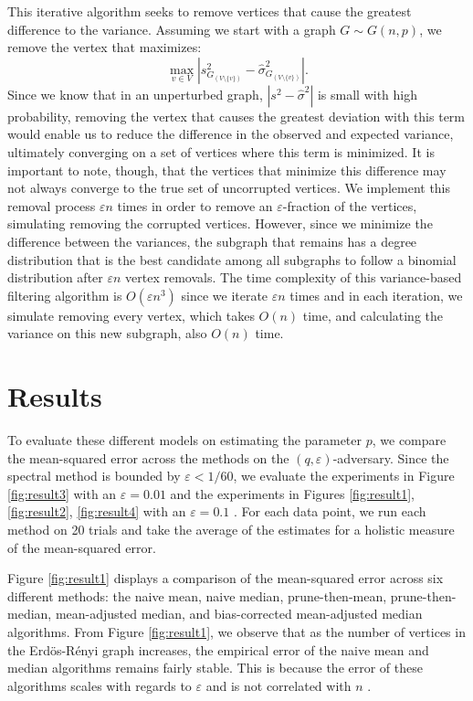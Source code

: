 \documentclass[10pt,onecolumn,letterpaper]{article}
\newcommand{\eps}{\varepsilon}
\newcommand{\erdos}{Erdös-Rényi }
\begin{document}
This iterative algorithm seeks to remove vertices that cause the greatest difference to the variance. Assuming we start with a graph \(G \sim G(n, p)\), we remove the vertex that maximizes: $$\max_{v \in V} \left| s^2_{G_{(V \setminus \{v\})}} - \hat{\sigma}^2_{G_{(V \setminus \{v\})}} \right|.$$ Since we know that in an unperturbed graph, $|s^2 - \hat{\sigma}^2|$ is small with high probability, removing the vertex that causes the greatest deviation with this term would enable us to reduce the difference in the observed and expected variance, ultimately converging on a set of vertices where this term is minimized. It is important to note, though, that the vertices that minimize this difference may not always converge to the true set of uncorrupted vertices. We implement this removal process $\eps$$n$ times in order to remove an $\eps$-fraction of the vertices, simulating removing the corrupted vertices. However, since we minimize the difference between the variances, the subgraph that remains has a degree distribution that is the best candidate among all subgraphs to follow a binomial distribution after $\eps$$n$ vertex removals. The time complexity of this variance-based filtering algorithm is $O(\eps n^3)$ since we iterate $\eps$$n$ times and in each iteration, we simulate removing every vertex, which takes $O(n)$ time, and calculating the variance on this new subgraph, also $O(n)$ time. 

\section{Results} \label{results}
To evaluate these different models on estimating the parameter $p$, we compare the mean-squared error across the methods on the $\left(q, \eps \right)$-adversary. Since the spectral method is bounded by $\eps < 1 / 60$, we evaluate the experiments in Figure \ref{fig:result3} with an $\eps = 0.01$ and the experiments in Figures \ref{fig:result1}, \ref{fig:result2}, \ref{fig:result4} with an $\eps = 0.1$ 
\cite{acharya2022robustestimationrandomgraphs}. For each data point, we run each method on 20 trials and take the average of the estimates for a holistic measure of the mean-squared error.

Figure \ref{fig:result1} displays a comparison of the mean-squared error across six different methods: the naive mean, naive median, prune-then-mean, prune-then-median, mean-adjusted median, and bias-corrected mean-adjusted median algorithms. From Figure \ref{fig:result1}, we observe that as the number of vertices in the \erdos graph increases, the empirical error of the naive mean and median algorithms remains fairly stable. This is because the error of these algorithms scales with regards to $\eps$ and is not correlated with $n$ \cite{acharya2022robustestimationrandomgraphs}.
\end{document}
